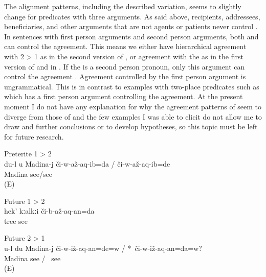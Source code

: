 The alignment patterns, including the described variation, seems to slightly change for predicates with three arguments. As said above, recipients, addressees, beneficiaries, and other arguments that are not agents or patients never control . In sentences with first person  arguments and second person  arguments, both  and  can control the agreement. This means we either have hierarchical agreement with 2 > 1 as in the second version of , or agreement with the  as in the first version of  and in . If the  is a second person pronoun, only this argument can control the agreement . Agreement controlled by the first person  argument is ungrammatical. This is in contrast to examples with two-place predicates such as  which has a first person  argument controlling the agreement. At the present moment I do not have any explanation for why the agreement patterns of  seem to diverge from those of  and the few examples I was able to elicit do not allow me to draw and further conclusions or to develop hypotheses, so this topic must be left for future research.


%
\begin{exe}
		\ex	Preterite 1 > 2\\	\label{ex:‎‎‎I showed you to Madina PT12}
		\gll	du-l	u	Madina-j	či-w-až-aq-ib=da	/	či-w-až-aq-ib=de\\
					Madina	see\slash{}see \\
		\glt	{} (E)

		\ex	Future 1 > 2\\	\label{ex:(I) will show (you) the tree FT12}
		\gll	hek'	kːalkːi	či-b-až-aq-an=da\\
				tree	see\\
		\glt	{}

		\ex	Future 2 > 1\\	\label{ex:‎Will you show me to Madina FT21}
		\gll	u-l	du	Madina-j	či-w-iž-aq-an=de=w /	 {*}~či-w-iž-aq-an=da=w?\\
					Madina	see	/	{\hphantom{*}}~see\\
		\glt	{} (E)
\end{exe}

